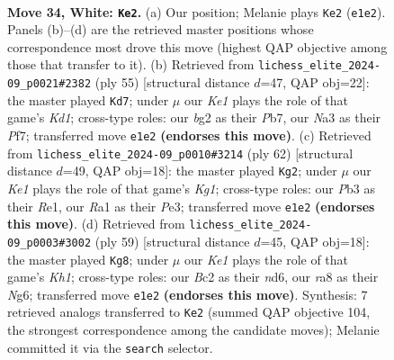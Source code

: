 \documentclass[11pt]{article}
\begin{document}
\clearpage

\begin{figure}[p]\centering
\begin{subfigure}{0.46\textwidth}\centering
\resizebox{\linewidth}{!}{%
\newchessgame
\chessboard[
  setfen={r3n3/p1pp4/1p4k1/5p1p/2P2P2/NP6/P1BP2bP/R3K3 w - - 6 34},
  showmover=false,
  pgfstyle=straightmove, color=movearrow, markmove={e1-e2}
]}
\caption{}
\end{subfigure}\hfill
\begin{subfigure}{0.46\textwidth}\centering
\resizebox{\linewidth}{!}{%
\newchessgame
\chessboard[
  setfen={1r1k4/pp2pp1p/5bp1/2R5/8/2P2N1P/PP3PP1/5K2 b - - 8 28},
  showmover=false,
  pgfstyle=straightmove, color=movearrow, markmove={d8-d7}
]}
\caption{}
\end{subfigure}
\\[4pt]
\begin{subfigure}{0.46\textwidth}\centering
\resizebox{\linewidth}{!}{%
\newchessgame
\chessboard[
  setfen={r5k1/5p2/3B1b2/1pPp2p1/pn1P2P1/4PN2/1P6/4R1K1 w - - 0 32},
  showmover=false,
  pgfstyle=straightmove, color=movearrow, markmove={g1-g2}
]}
\caption{}
\end{subfigure}\hfill
\begin{subfigure}{0.46\textwidth}\centering
\resizebox{\linewidth}{!}{%
\newchessgame
\chessboard[
  setfen={5r1k/7p/p1bNppn1/1p6/1P2P3/2p4P/P1B2PP1/3R2K1 b - - 0 30},
  showmover=false,
  pgfstyle=straightmove, color=movearrow, markmove={h8-g8}
]}
\caption{}
\end{subfigure}
\caption{\textbf{Move 34, White: \texttt{Ke2}.} (a) Our position; Melanie plays \texttt{Ke2} (\texttt{e1e2}). Panels (b)--(d) are the retrieved master positions whose correspondence most drove this move (highest QAP objective among those that transfer to it). (b) Retrieved from \texttt{lichess\_elite\_2024-09\_p0021\#2382} (ply 55) [structural distance $d$=47, QAP obj=22]: the master played \texttt{Kd7}; under $\mu$ our \emph{Ke1} plays the role of that game's \emph{Kd1}; cross-type roles: our \emph{b}g2 as their \emph{P}b7, our \emph{N}a3 as their \emph{P}f7; transferred move \texttt{e1e2} \textbf{(endorses this move)}. (c) Retrieved from \texttt{lichess\_elite\_2024-09\_p0010\#3214} (ply 62) [structural distance $d$=49, QAP obj=18]: the master played \texttt{Kg2}; under $\mu$ our \emph{Ke1} plays the role of that game's \emph{Kg1}; cross-type roles: our \emph{P}b3 as their \emph{R}e1, our \emph{R}a1 as their \emph{P}e3; transferred move \texttt{e1e2} \textbf{(endorses this move)}. (d) Retrieved from \texttt{lichess\_elite\_2024-09\_p0003\#3002} (ply 59) [structural distance $d$=45, QAP obj=18]: the master played \texttt{Kg8}; under $\mu$ our \emph{Ke1} plays the role of that game's \emph{Kh1}; cross-type roles: our \emph{B}c2 as their \emph{n}d6, our \emph{r}a8 as their \emph{N}g6; transferred move \texttt{e1e2} \textbf{(endorses this move)}. Synthesis: 7 retrieved analogs transferred to \texttt{Ke2} (summed QAP objective 104, the strongest correspondence among the candidate moves); Melanie committed it via the \texttt{search} selector.}
\label{fig:thought-m66}
\end{figure}
\end{document}
